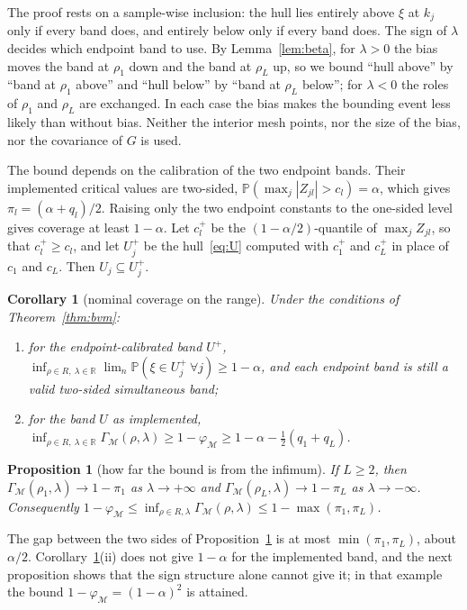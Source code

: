 \documentclass[11pt]{article}
\newtheorem{proposition}{Proposition}
\newtheorem{corollary}{Corollary}
\theoremstyle{definition}
\theoremstyle{remark}
\numberwithin{equation}{section}
\newcommand{\R}{\mathbb{R}}
\newcommand{\Prob}{\mathbb{P}}
\newcommand{\Mesh}{\mathcal{M}}
\begin{document}
The proof rests on a sample-wise inclusion: the hull lies entirely above $\xi$ at $k_j$ only if every band does, and entirely below only if every band does. The sign of $\lambda$ decides which endpoint band to use. By Lemma~\ref{lem:beta}, for $\lambda>0$ the bias moves the band at $\rho_1$ down and the band at $\rho_L$ up, so we bound ``hull above'' by ``band at $\rho_1$ above'' and ``hull below'' by ``band at $\rho_L$ below''; for $\lambda<0$ the roles of $\rho_1$ and $\rho_L$ are exchanged. In each case the bias makes the bounding event less likely than without bias. Neither the interior mesh points, nor the size of the bias, nor the covariance of $G$ is used.

The bound depends on the calibration of the two endpoint bands. Their implemented critical values are two-sided, $\Prob(\max_j|Z_{jl}|>c_l)=\alpha$, which gives $\pi_l=(\alpha+q_l)/2$. Raising only the two endpoint constants to the one-sided level gives coverage at least $1-\alpha$. Let $c_l^+$ be the $(1-\alpha/2)$-quantile of $\max_jZ_{jl}$, so that $c_l^+\ge c_l$, and let $U_j^+$ be the hull~\eqref{eq:U} computed with $c_1^+$ and $c_L^+$ in place of $c_1$ and $c_L$. Then $U_j\subseteq U_j^+$.

\begin{corollary}[nominal coverage on the range]\label{cor:uniform}
Under the conditions of Theorem~\ref{thm:bvm}:
\begin{enumerate}
\item[(i)] for the endpoint-calibrated band $U^+$, $\inf_{\rho\in R,\ \lambda\in\R}\lim_{n}\Prob(\xi\in U^+_j\ \forall j)\ge1-\alpha$, and each endpoint band is still a valid two-sided simultaneous band;
\item[(ii)] for the band $U$ as implemented, $\inf_{\rho\in R,\ \lambda\in\R}\Gamma_\Mesh(\rho,\lambda)\ge1-\varphi_\Mesh\ge1-\alpha-\tfrac12(q_1+q_L)$.
\end{enumerate}
\end{corollary}

\begin{proposition}[how far the bound is from the infimum]\label{prop:tight}
If $L\ge2$, then $\Gamma_\Mesh(\rho_1,\lambda)\to1-\pi_1$ as $\lambda\to+\infty$ and $\Gamma_\Mesh(\rho_L,\lambda)\to1-\pi_L$ as $\lambda\to-\infty$. Consequently $1-\varphi_\Mesh\le\inf_{\rho\in R,\lambda}\Gamma_\Mesh(\rho,\lambda)\le1-\max(\pi_1,\pi_L)$.
\end{proposition}

The gap between the two sides of Proposition~\ref{prop:tight} is at most $\min(\pi_1,\pi_L)$, about $\alpha/2$. Corollary~\ref{cor:uniform}(ii) does not give $1-\alpha$ for the implemented band, and the next proposition shows that the sign structure alone cannot give it; in that example the bound $1-\varphi_\Mesh=(1-\alpha)^2$ is attained.
\end{document}
